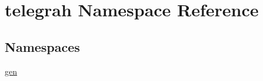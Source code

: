 \hypertarget{namespacetelegrah}{}\section{telegrah Namespace Reference}
\label{namespacetelegrah}
\subsection*{Namespaces}
\begin{DoxyCompactItemize}
\item 
 \hyperlink{namespacetelegrah_1_1gen}{gen}
\end{DoxyCompactItemize}
